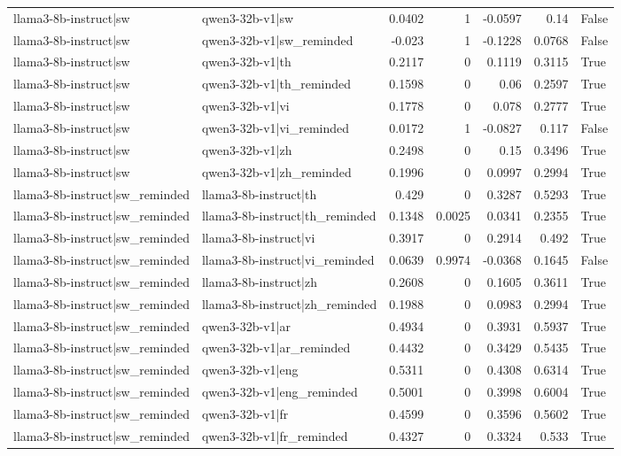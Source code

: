 \begin{table}
\begin{tabular}{l l r r r r l}
llama3-8b-instruct|sw & qwen3-32b-v1|sw & 0.0402 & 1 & -0.0597 & 0.14 & False \\
llama3-8b-instruct|sw & qwen3-32b-v1|sw_reminded & -0.023 & 1 & -0.1228 & 0.0768 & False \\
llama3-8b-instruct|sw & qwen3-32b-v1|th & 0.2117 & 0 & 0.1119 & 0.3115 & True \\
llama3-8b-instruct|sw & qwen3-32b-v1|th_reminded & 0.1598 & 0 & 0.06 & 0.2597 & True \\
llama3-8b-instruct|sw & qwen3-32b-v1|vi & 0.1778 & 0 & 0.078 & 0.2777 & True \\
llama3-8b-instruct|sw & qwen3-32b-v1|vi_reminded & 0.0172 & 1 & -0.0827 & 0.117 & False \\
llama3-8b-instruct|sw & qwen3-32b-v1|zh & 0.2498 & 0 & 0.15 & 0.3496 & True \\
llama3-8b-instruct|sw & qwen3-32b-v1|zh_reminded & 0.1996 & 0 & 0.0997 & 0.2994 & True \\
llama3-8b-instruct|sw_reminded & llama3-8b-instruct|th & 0.429 & 0 & 0.3287 & 0.5293 & True \\
llama3-8b-instruct|sw_reminded & llama3-8b-instruct|th_reminded & 0.1348 & 0.0025 & 0.0341 & 0.2355 & True \\
llama3-8b-instruct|sw_reminded & llama3-8b-instruct|vi & 0.3917 & 0 & 0.2914 & 0.492 & True \\
llama3-8b-instruct|sw_reminded & llama3-8b-instruct|vi_reminded & 0.0639 & 0.9974 & -0.0368 & 0.1645 & False \\
llama3-8b-instruct|sw_reminded & llama3-8b-instruct|zh & 0.2608 & 0 & 0.1605 & 0.3611 & True \\
llama3-8b-instruct|sw_reminded & llama3-8b-instruct|zh_reminded & 0.1988 & 0 & 0.0983 & 0.2994 & True \\
llama3-8b-instruct|sw_reminded & qwen3-32b-v1|ar & 0.4934 & 0 & 0.3931 & 0.5937 & True \\
llama3-8b-instruct|sw_reminded & qwen3-32b-v1|ar_reminded & 0.4432 & 0 & 0.3429 & 0.5435 & True \\
llama3-8b-instruct|sw_reminded & qwen3-32b-v1|eng & 0.5311 & 0 & 0.4308 & 0.6314 & True \\
llama3-8b-instruct|sw_reminded & qwen3-32b-v1|eng_reminded & 0.5001 & 0 & 0.3998 & 0.6004 & True \\
llama3-8b-instruct|sw_reminded & qwen3-32b-v1|fr & 0.4599 & 0 & 0.3596 & 0.5602 & True \\
llama3-8b-instruct|sw_reminded & qwen3-32b-v1|fr_reminded & 0.4327 & 0 & 0.3324 & 0.533 & True \\

\end{tabular}
\end{table}
